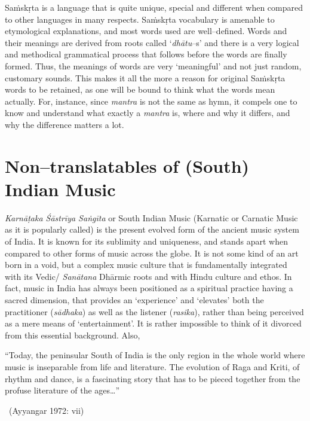 Saṁskṛta is a language that is quite unique, special and different when compared to other languages in many respects. Saṁskṛta vocabulary is amenable to etymological explanations, and most words used are well–defined. Words and their meanings are derived from roots called ‘\textit{dhātu}–s’ and there is a very logical and methodical grammatical process that follows before the words are finally formed. Thus, the meanings of words are very ‘meaningful’ and not just random, customary sounds. This makes it all the more a reason for original Saṁskṛta words to be retained, as one will be bound to think what the words mean actually. For, instance, since \textit{mantra} is not the same as hymn, it compels one to know and understand what exactly a \textit{mantra} is, where and why it differs, and why the difference matters a lot.


\section*{Non–translatables of (South) Indian Music}

\textit{Karnāṭaka Śāstrīya Saṅgīta} or South Indian Music (Karnatic or Carnatic Music as it is popularly called) is the present evolved form of the ancient music system of India. It is known for its sublimity and uniqueness, and stands apart when compared to other forms of music across the globe. It is not some kind of an art born in a void, but a complex music culture that is fundamentally integrated with its Vedic/ \textit{Sanātana} Dhārmic roots and with Hindu culture and ethos. In fact, music in India has always been positioned as a spiritual practice having a sacred dimension, that provides an ‘experience’ and ‘elevates’ both the practitioner (\textit{sādhaka}) as well as the listener (\textit{rasika}), rather than being perceived as a mere means of ‘entertainment’. It is rather impossible to think of it divorced from this essential background. Also,

\begin{myquote}
“Today, the peninsular South of India is the only region in the whole world where music is inseparable from life and literature. The evolution of Raga and Kriti, of rhythm and dance, is a fascinating story that has to be pieced together from the profuse literature of the ages…” 

~\hfill (Ayyangar 1972: vii)
\end{myquote}

